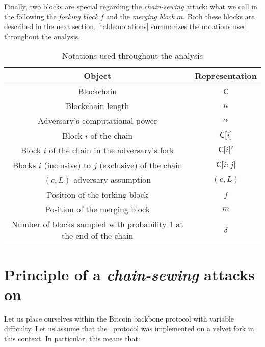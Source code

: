       Finally, two blocks are special regarding the \textit{chain-sewing} attack: what we call in the following the \emph{forking block}  \(f\) and the \emph{merging block} \(m\). Both these blocks are described in the next section. \autoref{table:notations} summarizes the notations used throughout the analysis.

      \begin{table}[ht]
        \centering
        \begin{tabular}{|c|c|}
          \hline
          Object & Representation\\
          \hline
          Blockchain & \(\mathsf{C}\)\\
          \hline
          Blockchain length &  \(n\)\\
          \hline
          Adversary's computational power &  \(\alpha\)\\
          \hline
          Block  \(i\) of the chain &  \(\mathsf{C[}i\mathsf{]}\)\\
          \hline
          Block \(i\) of the chain in the adversary's fork & \(\mathsf{C[}i\mathsf{]}'\)\\
          \hline
          Blocks \(i\) (inclusive) to  \(j\) (exclusive) of the chain &  \(\mathsf{C[}i\mathsf{:}j\mathsf{]}\)\\
          \hline
          \((c,L)\)-adversary assumption &  \((c,L)\)\\
          \hline
          Position of the forking block & \(f\)\\
          \hline
          Position of the merging block &  \(m\)\\
          \hline
          Number of blocks sampled with probability 1 at the end of the chain & \(\delta\)\\
          \hline
        \end{tabular}
        \caption{Notations used throughout the analysis}
        \label{table:notations}
      \end{table} 
      
    \section{Principle of a \textit{chain-sewing} attacks on \FC}
      \label{section:attack}
      Let us place ourselves within the Bitcoin backbone protocol with variable difficulty. Let us assume that the \FC\ protocol was implemented on a velvet fork in this context. In particular, this means that:

